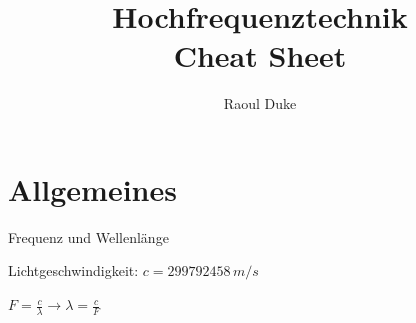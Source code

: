 \documentclass[german]{latex4ei/latex4ei_sheet}
\title{Hochfrequenztechnik \\ Cheat Sheet}
\author{Raoul Duke}
\begin{document}
\maketitle
\section{Allgemeines}
    \begin{sectionbox}
        \begin{bluebox}{Frequenz und Wellenlänge}
            \item Lichtgeschwindigkeit: $c = 299792458\,m/s$
            \item $F = \frac{c}{\lambda} \rightarrow \lambda = \frac{c}{F}$
        \end{bluebox}
    \end{sectionbox}
\end{document}
